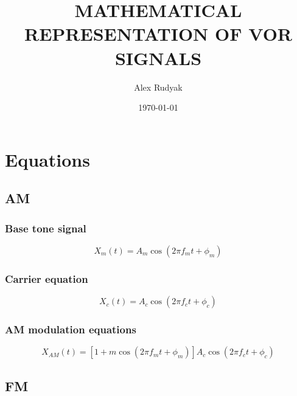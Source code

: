 \documentclass[12pt]{article}
\title{MATHEMATICAL REPRESENTATION OF VOR SIGNALS}
\author{Alex Rudyak}
\date{\today}
\begin{document}
\maketitle
\tableofcontents

\newpage
\section{Equations} %
\subsection{AM}%
\subsubsection{Base tone signal}

\begin{equation}
\label{Base tone equation am}
X_{m}(t) = A_m \cos (2\pi f_m t + \phi_m)
\end{equation}

\subsubsection{Carrier equation}
\begin{equation}
\label{Carrier equation am}
X_{c}(t) = A_c \cos (2\pi f_c t + \phi_c)
\end{equation}

\subsubsection{AM modulation equations}
\begin{equation}
\label{AM modulation equation}
X_{AM}(t) = [1 + m\cos(2\pi f_m t + \phi_m)]A_c\cos(2\pi f_c t + \phi_c)
\end{equation}

\subsection{FM}%
\end{document}
